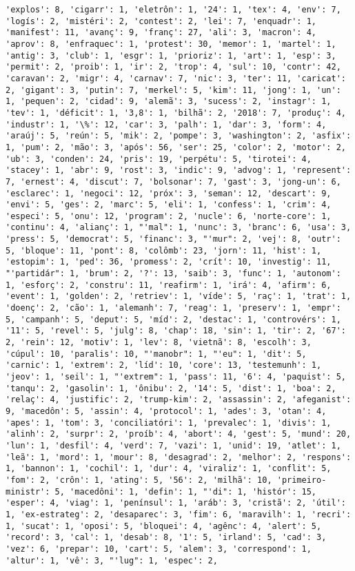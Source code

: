 \documentclass[11pt]{article}
\begin{document}
\begin{Verbatim}[commandchars=\\\{\}]
'explos': 8, 'cigarr': 1, 'eletrôn': 1, '24': 1, 'tex': 4, 'env': 7, 'logís': 2, 'mistéri': 2, 'contest': 2, 'lei': 7, 'enquadr': 1, 'manifest': 11, 'avanç': 9, 'franç': 27, 'ali': 3, 'macron': 4, 'aprov': 8, 'enfraquec': 1, 'protest': 30, 'memor': 1, 'martel': 1, 'antig': 3, 'club': 1, 'esgr': 1, 'prioriz': 1, 'art': 1, 'esp': 3, 'permit': 2, 'proib': 1, 'ir': 2, 'trop': 4, 'sul': 10, 'contr': 42, 'caravan': 2, 'migr': 4, 'carnav': 7, 'nic': 3, 'ter': 11, 'caricat': 2, 'gigant': 3, 'putin': 7, 'merkel': 5, 'kim': 11, 'jong': 1, 'un': 1, 'pequen': 2, 'cidad': 9, 'alemã': 3, 'sucess': 2, 'instagr': 1, 'tev': 1, 'déficit': 1, '3,8': 1, 'bilhã': 2, '2018': 7, 'produç': 4, 'industr': 1, '\%': 12, 'car': 3, 'palh': 1, 'dar': 3, 'form': 4, 'araúj': 5, 'reún': 5, 'mik': 2, 'pompe': 3, 'washington': 2, 'asfix': 1, 'pum': 2, 'mão': 3, 'após': 56, 'ser': 25, 'color': 2, 'motor': 2, 'ub': 3, 'conden': 24, 'pris': 19, 'perpétu': 5, 'tirotei': 4, 'stacey': 1, 'abr': 9, 'rost': 3, 'indic': 9, 'advog': 1, 'represent': 7, 'ernest': 4, 'discut': 7, 'bolsonar': 7, 'gast': 3, 'jong-un': 6, 'esclarec': 1, 'negoci': 12, 'próx': 3, 'seman': 12, 'descart': 9, 'envi': 5, 'ges': 2, 'marc': 5, 'eli': 1, 'confess': 1, 'crim': 4, 'especi': 5, 'onu': 12, 'program': 2, 'nucle': 6, 'norte-core': 1, 'continu': 4, 'alianç': 1, "'mal": 1, 'nunc': 3, 'branc': 6, 'usa': 3, 'press': 5, 'democrat': 5, 'financ': 3, "'mur": 2, 'vej': 8, 'outr': 5, 'bloque': 11, 'pont': 8, 'colômb': 23, 'jorn': 11, 'hist': 1, 'estopim': 1, 'ped': 36, 'promess': 2, 'crít': 10, 'investig': 11, "'partidár": 1, 'brum': 2, '?': 13, 'saib': 3, 'func': 1, 'autonom': 1, 'esforç': 2, 'constru': 11, 'reafirm': 1, 'irá': 4, 'afirm': 6, 'event': 1, 'golden': 2, 'retriev': 1, 'víde': 5, 'raç': 1, 'trat': 1, 'doenç': 2, 'cão': 1, 'alemanh': 7, 'reag': 1, 'preserv': 1, 'empr': 5, 'campanh': 5, 'deput': 5, 'míd': 2, 'destac': 1, 'controvérs': 1, '11': 5, 'revel': 5, 'julg': 8, 'chap': 18, 'sin': 1, 'tir': 2, '67': 2, 'rein': 12, 'motiv': 1, 'lev': 8, 'vietnã': 8, 'escolh': 3, 'cúpul': 10, 'paralis': 10, "'manobr": 1, "'eu": 1, 'dit': 5, 'carnic': 1, 'extrem': 2, 'líd': 10, 'core': 13, 'testemunh': 1, 'jeov': 1, 'seil': 1, "'extrem": 1, 'pass': 11, '6': 4, 'paquist': 5, 'tanqu': 2, 'gasolin': 1, 'ônibu': 2, '14': 5, 'dist': 1, 'boa': 2, 'relaç': 4, 'justific': 2, 'trump-kim': 2, 'assassin': 2, 'afeganist': 9, 'macedôn': 5, 'assin': 4, 'protocol': 1, 'ades': 3, 'otan': 4, 'apes': 1, 'tom': 3, 'conciliatóri': 1, 'prevalec': 1, 'divis': 1, 'alinh': 2, 'surpr': 2, 'proíb': 4, 'abort': 4, 'gest': 5, 'mund': 20, 'lun': 1, 'desfil': 4, 'verd': 7, 'vazi': 1, 'unid': 19, 'atlet': 1, 'leã': 1, 'mord': 1, 'mour': 8, 'desagrad': 2, 'melhor': 2, 'respons': 1, 'bannon': 1, 'cochil': 1, 'dur': 4, 'viraliz': 1, 'conflit': 5, 'fom': 2, 'crôn': 1, 'ating': 5, '56': 2, 'milhã': 10, 'primeiro-ministr': 5, 'macedôni': 1, 'defin': 1, "'di": 1, 'histór': 15, 'esper': 4, 'viag': 1, 'penínsul': 1, 'aráb': 3, 'cristã': 2, 'útil': 1, 'ex-estrateg': 2, 'desaparec': 3, 'fim': 6, 'maravilh': 1, 'recri': 1, 'sucat': 1, 'oposi': 5, 'bloquei': 4, 'agênc': 4, 'alert': 5, 'record': 3, 'cal': 1, 'desab': 8, '1': 5, 'irland': 5, 'cad': 3, 'vez': 6, 'prepar': 10, 'cart': 5, 'alem': 3, 'correspond': 1, 'altur': 1, 'vê': 3, "'lug": 1, 'espec': 2, 
\end{Verbatim}
\end{document}
